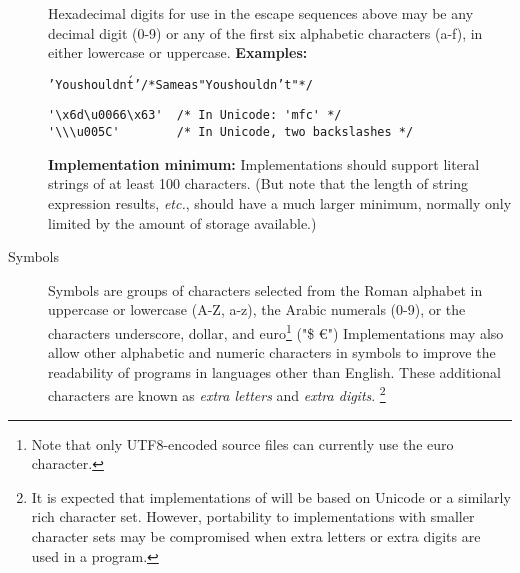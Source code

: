 \begin{description}
\begin{table}
\begin{tabularx}{\textwidth}{>{\bfseries}lX}
\\\bottomrule
\end{tabularx}
\end{table}
 Hexadecimal digits for use in the escape sequences above may be any
decimal digit (0-9) or any of the first six alphabetic
characters (a-f), in either lowercase or uppercase.
 \textbf{Examples:}
\begin{alltt}
  'You shouldn\'t'  /* Same as "You shouldn't" */
  \end{alltt}
\begin{lstlisting}
'\x6d\u0066\x63'  /* In Unicode: 'mfc' */
'\\\u005C'        /* In Unicode, two backslashes */
\end{lstlisting}
 \textbf{Implementation minimum:} Implementations should support
literal strings of at least 100 characters.
(But note that the length of string expression results, \emph{etc.}, should
have a much larger minimum, normally only limited by the amount of
storage available.)
\item[Symbols]\label{refsyms}

Symbols are groups of characters selected from the Roman alphabet
in uppercase or lowercase (A-Z, a-z), the Arabic numerals
(0-9), or the characters underscore, dollar, and euro\footnote{
Note that only UTF8-encoded source files can currently use the euro
character.} ("\textunderscore \$ \euro")
Implementations may also allow other alphabetic and numeric characters
in symbols to improve the readability of programs in languages other
than English.  These additional characters are known as \emph{extra
letters} and \emph{extra digits}.
\footnote{
It is expected that implementations of \nr{} will be based on
Unicode or a similarly rich character set.
However, portability to implementations with smaller character sets may
be compromised when extra letters or extra digits are used in a program.
}
 

\end{description}
